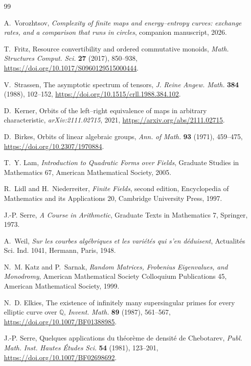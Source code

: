 \documentclass[11pt]{article}
\theoremstyle{definition}
\theoremstyle{plain}
\theoremstyle{remark}
\newcommand{\Q}{\mathbb Q}
\begin{document}
\begingroup
\small
\setlength{\itemsep}{0.25em}
\begin{thebibliography}{99}

A.~Vorozhtsov,
\emph{Complexity of finite maps and energy--entropy curves: exchange rates,
and a comparison that runs in circles}, companion manuscript, 2026.

T.~Fritz,
Resource convertibility and ordered commutative monoids,
\emph{Math. Structures Comput. Sci.} \textbf{27} (2017), 850--938,
\url{https://doi.org/10.1017/S0960129515000444}.

V.~Strassen,
The asymptotic spectrum of tensors,
\emph{J. Reine Angew. Math.} \textbf{384} (1988), 102--152,
\url{https://doi.org/10.1515/crll.1988.384.102}.

D.~Kerner,
Orbits of the left--right equivalence of maps in arbitrary characteristic,
\emph{arXiv:2111.02715}, 2021,
\url{https://arxiv.org/abs/2111.02715}.

D.~Birkes,
Orbits of linear algebraic groups,
\emph{Ann. of Math.} \textbf{93} (1971), 459--475,
\url{https://doi.org/10.2307/1970884}.

T.~Y. Lam,
\emph{Introduction to Quadratic Forms over Fields},
Graduate Studies in Mathematics 67, American Mathematical Society, 2005.

R.~Lidl and H.~Niederreiter,
\emph{Finite Fields}, second edition,
Encyclopedia of Mathematics and its Applications 20,
Cambridge University Press, 1997.

J.-P. Serre,
\emph{A Course in Arithmetic},
Graduate Texts in Mathematics 7, Springer, 1973.

A.~Weil,
\emph{Sur les courbes alg\'ebriques et les vari\'et\'es qui s'en d\'eduisent},
Actualit\'es Sci. Ind. 1041, Hermann, Paris, 1948.

N.~M. Katz and P.~Sarnak,
\emph{Random Matrices, Frobenius Eigenvalues, and Monodromy},
American Mathematical Society Colloquium Publications 45,
American Mathematical Society, 1999.

N.~D. Elkies,
The existence of infinitely many supersingular primes for every elliptic curve
over \(\Q\),
\emph{Invent. Math.} \textbf{89} (1987), 561--567,
\url{https://doi.org/10.1007/BF01388985}.

J.-P. Serre,
Quelques applications du th\'eor\`eme de densit\'e de Chebotarev,
\emph{Publ. Math. Inst. Hautes \'Etudes Sci.} \textbf{54} (1981), 123--201,
\url{https://doi.org/10.1007/BF02698692}.


\end{thebibliography}
\end{document}
